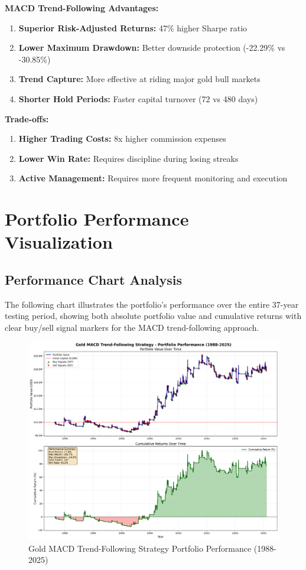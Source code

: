 \documentclass[11pt,a4paper]{article}
\begin{document}
\textbf{MACD Trend-Following Advantages:}
\begin{enumerate}
    \item \textbf{Superior Risk-Adjusted Returns:} 47\% higher Sharpe ratio
    \item \textbf{Lower Maximum Drawdown:} Better downside protection (-22.29\% vs -30.85\%)
    \item \textbf{Trend Capture:} More effective at riding major gold bull markets
    \item \textbf{Shorter Hold Periods:} Faster capital turnover (72 vs 480 days)
\end{enumerate}

\textbf{Trade-offs:}
\begin{enumerate}
    \item \textbf{Higher Trading Costs:} 8x higher commission expenses
    \item \textbf{Lower Win Rate:} Requires discipline during losing streaks
    \item \textbf{Active Management:} Requires more frequent monitoring and execution
\end{enumerate}

\newpage

\section{Portfolio Performance Visualization}

\subsection{Performance Chart Analysis}

The following chart illustrates the portfolio's performance over the entire 37-year testing period, showing both absolute portfolio value and cumulative returns with clear buy/sell signal markers for the MACD trend-following approach.

\begin{figure}[H]
\centering
\includegraphics[width=\textwidth]{gold_trend_portfolio_performance.png}
\caption{Gold MACD Trend-Following Strategy Portfolio Performance (1988-2025)}
\label{fig:portfolio_performance}
\end{figure}
\end{document}
